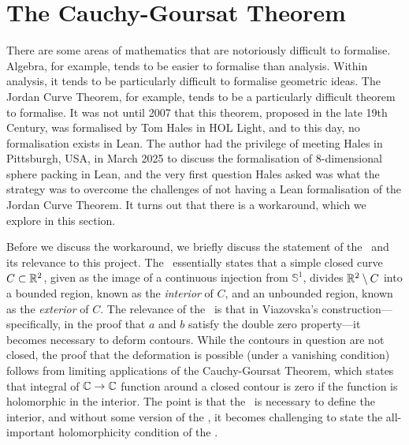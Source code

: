 \section{The Cauchy-Goursat Theorem}
\label{Ch5:Sec:Cauchy-Goursat}

\begin{comment}
Maybe begin with an anecdote - no sooner had we entered Hales's office in Pittsburgh than he asked about how we plan to deform integration contours.

Have 3 subsections.
1. Informal maths
2. Discussion of existing formalisation of closed rectangular case, with emphasis on why we don't have it for other cases (cite Hales's formalisation of the Jordan Curve Theorem in HOL-Light, maybe try and explain why we don't have something similar in Lean)
3. Discussion of our approach to the indefinite case (informally and formally)
Also maybe find better words than closed/open? Because these words are NOT used here in a topological sense, but rather in a very visual sense ("are the two endpoints of the curve the same point or are they not? Does the curve even have two endpoints or does it just have one and then go off to i\infty in the other?")
\end{comment}

There are some areas of mathematics that are notoriously difficult to formalise. Algebra, for example, tends to be easier to formalise than analysis. Within analysis, it tends to be particularly difficult to formalise geometric ideas. The Jordan Curve Theorem, for example, tends to be a particularly difficult theorem to formalise. It was not until 2007 that this theorem, proposed in the late 19th Century, was formalised by Tom Hales \cite{JordanCurve} in HOL Light, and to this day, no formalisation exists in Lean. The author had the privilege of meeting Hales in Pittsburgh, USA, in March 2025 to discuss the formalisation of $8$-dimensional sphere packing in Lean, and the very first question Hales asked was what the strategy was to overcome the challenges of not having a Lean formalisation of the Jordan Curve Theorem. It turns out that there is a workaround, which we explore in this section.

Before we discuss the workaround, we briefly discuss the statement of the \JCT\ and its relevance to this project. The \JCT\ essentially states that a simple closed curve $C \subset \mathbb{R}^2$, given as the image of a continuous injection from $\mathbb{S}^1$, divides $\mathbb{R}^2 \setminus C$ into a bounded region, known as the \textit{interior} of $C$, and an unbounded region, known as the \textit{exterior} of $C$. The relevance of the \JCT\ is that in Viazovska's construction---specifically, in the proof that $a$ and $b$ satisfy the double zero property---it becomes necessary to deform contours. While the contours in question are not closed, the proof that the deformation is possible (under a vanishing condition) follows from limiting applications of the Cauchy-Goursat Theorem, which states that integral of $\mathbb{C} \to \mathbb{C}$ function around a closed contour is zero if the function is holomorphic in the interior. The point is that the \JCT\ is necessary to define the interior, and without some version of the \JCT, it becomes challenging to state the all-important holomorphicity condition of the \CGT.


